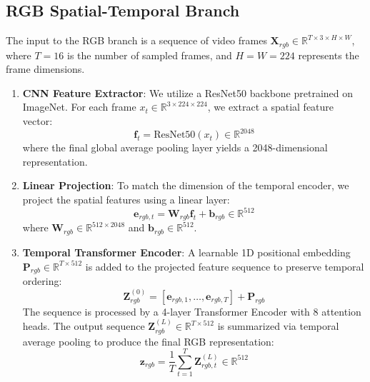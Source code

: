 \documentclass[conference]{IEEEtran}
\begin{document}
\subsection{RGB Spatial-Temporal Branch}
The input to the RGB branch is a sequence of video frames $\mathbf{X}_{rgb} \in \mathbb{R}^{T \times 3 \times H \times W}$, where $T=16$ is the number of sampled frames, and $H=W=224$ represents the frame dimensions. 
\begin{enumerate}
    \item \textbf{CNN Feature Extractor}: We utilize a ResNet50 backbone pretrained on ImageNet. For each frame $x_t \in \mathbb{R}^{3 \times 224 \times 224}$, we extract a spatial feature vector:
    \begin{equation}
        \mathbf{f}_t = \text{ResNet50}(x_t) \in \mathbb{R}^{2048}
    \end{equation}
    where the final global average pooling layer yields a 2048-dimensional representation.
    \item \textbf{Linear Projection}: To match the dimension of the temporal encoder, we project the spatial features using a linear layer:
    \begin{equation}
        \mathbf{e}_{rgb, t} = \mathbf{W}_{rgb} \mathbf{f}_t + \mathbf{b}_{rgb} \in \mathbb{R}^{512}
    \end{equation}
    where $\mathbf{W}_{rgb} \in \mathbb{R}^{512 \times 2048}$ and $\mathbf{b}_{rgb} \in \mathbb{R}^{512}$.
    \item \textbf{Temporal Transformer Encoder}: A learnable 1D positional embedding $\mathbf{P}_{rgb} \in \mathbb{R}^{T \times 512}$ is added to the projected feature sequence to preserve temporal ordering:
    \begin{equation}
        \mathbf{Z}_{rgb}^{(0)} = [\mathbf{e}_{rgb, 1}, \dots, \mathbf{e}_{rgb, T}] + \mathbf{P}_{rgb}
    \end{equation}
    The sequence is processed by a 4-layer Transformer Encoder with 8 attention heads. The output sequence $\mathbf{Z}_{rgb}^{(L)} \in \mathbb{R}^{T \times 512}$ is summarized via temporal average pooling to produce the final RGB representation:
    \begin{equation}
        \mathbf{z}_{rgb} = \frac{1}{T} \sum_{t=1}^T \mathbf{Z}_{rgb, t}^{(L)} \in \mathbb{R}^{512}
    \end{equation}
\end{enumerate}
\end{document}

